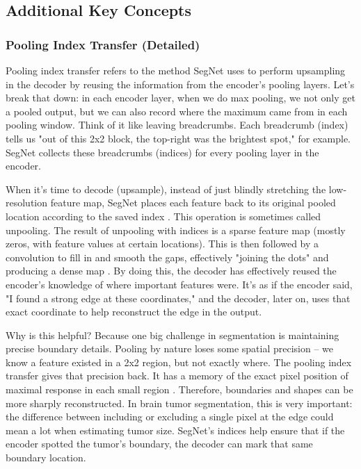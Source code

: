 \subsection{Additional Key Concepts}
\label{sec:additional_concepts}

\subsubsection{Pooling Index Transfer (Detailed)}
\label{sec:pooling_index_detailed}

Pooling index transfer refers to the method SegNet uses to perform upsampling in the decoder by reusing the information from the encoder's pooling layers. Let's break that down: in each encoder layer, when we do max pooling, we not only get a pooled output, but we can also record where the maximum came from in each pooling window. Think of it like leaving breadcrumbs. Each breadcrumb (index) tells us "out of this 2x2 block, the top-right was the brightest spot," for example. SegNet collects these breadcrumbs (indices) for every pooling layer in the encoder.

When it's time to decode (upsample), instead of just blindly stretching the low-resolution feature map, SegNet places each feature back to its original pooled location according to the saved index \cite{paperswithcode2023segnet}. This operation is sometimes called unpooling. The result of unpooling with indices is a sparse feature map (mostly zeros, with feature values at certain locations). This is then followed by a convolution to fill in and smooth the gaps, effectively "joining the dots" and producing a dense map \cite{fezan2023segmentation}. By doing this, the decoder has effectively reused the encoder's knowledge of where important features were. It's as if the encoder said, "I found a strong edge at these coordinates," and the decoder, later on, uses that exact coordinate to help reconstruct the edge in the output.

Why is this helpful? Because one big challenge in segmentation is maintaining precise boundary details. Pooling by nature loses some spatial precision – we know a feature existed in a 2x2 region, but not exactly where. The pooling index transfer gives that precision back. It has a memory of the exact pixel position of maximal response in each small region \cite{fezan2023segmentation}. Therefore, boundaries and shapes can be more sharply reconstructed. In brain tumor segmentation, this is very important: the difference between including or excluding a single pixel at the edge could mean a lot when estimating tumor size. SegNet's indices help ensure that if the encoder spotted the tumor's boundary, the decoder can mark that same boundary location.

